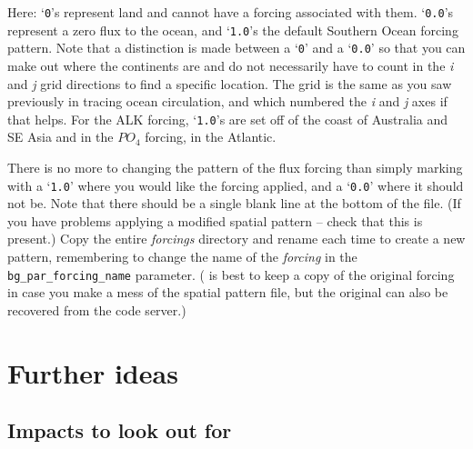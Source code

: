 Here: ‘\texttt{0}’s represent land and cannot have a forcing associated with them. ‘\texttt{0.0}’s represent a zero flux to the ocean, and ‘\texttt{1.0}’s the default Southern Ocean forcing pattern. Note that a distinction is made between a ‘\texttt{0}’ and a ‘\texttt{0.0}’ so that you can make out where the continents are and do not necessarily have to count in the \textit{i} and \textit{j} grid directions to find a specific location. The grid is the same as you saw previously in tracing ocean circulation, and which numbered the \textit{i} and \textit{j} axes if that helps. For the ALK forcing, ‘\texttt{1.0}’s are set off of the coast of Australia and SE Asia and in the \(PO_{4}\) forcing, in the Atlantic.

There is no more to changing the pattern of the flux forcing than simply marking with a ‘\texttt{1.0}’ where you would like the forcing applied, and a ‘\texttt{0.0}’ where it should not be. Note that there should be a single blank line at the bottom of the file. (If you have problems applying a modified spatial pattern – check that this is present.) Copy the entire \textit{forcings} directory and rename each time to create a new pattern, remembering to change the name of the \textit{forcing} in the \texttt{bg\_par\_forcing\_name} parameter. ( is best to keep a copy of the original forcing in case you make a mess of the spatial pattern file, but the original can also be recovered from the code server.)

\newpage

\section{Further ideas}


\subsection{Impacts to look out for}


